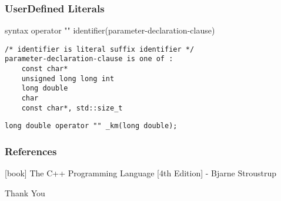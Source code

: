 \documentclass{beamer}
\begin{document}
\begin{frame}[fragile]
\frametitle{UserDefined Literals}
\begin{block}{syntax}
operator "" identifier(parameter-declaration-clause)
\end{block}
\begin{lstlisting}
/* identifier is literal suffix identifier */
parameter-declaration-clause is one of :
    const char*
    unsigned long long int
    long double
    char
    const char*, std::size_t
\end{lstlisting}
\begin{example}
\begin{lstlisting}
long double operator "" _km(long double);
\end{lstlisting}
\end{example}
\end{frame}




\begin{frame}
\frametitle{References}
\begin{thebibliography}{2} %
[book]
 The C++ Programming Language [4th Edition] - Bjarne Stroustrup
\end{thebibliography}
\end{frame}


\begin{frame}
\Huge{\centerline{Thank You}}
\end{frame}





\end{document}
